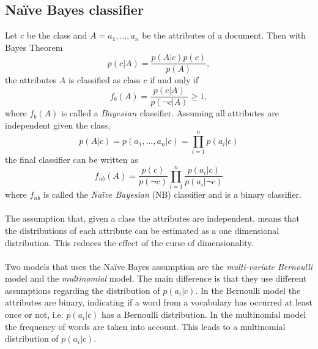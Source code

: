 \subsection{Naïve Bayes classifier}
Let $c$ be the class and $A = a_1, \dots ,a_n$ be the attributes of a document. Then with Bayes Theorem
\begin{equation}
p(c|A)=\frac{p(A|c)p(c)}{p(A)},
\end{equation}
the attributes $A$ is classified as class $c$ if and only if
\begin{equation}
f_b(A)=\frac{p(c|A)}{p(\neg c|A)} \geq 1,
\end{equation}
where $f_b(A)$ is called a $Bayesian$ classifier. Assuming all attributes are independent given the class, 
\[
p(A|c)=p(a_1,\dots ,a_n | c) = \prod_{i=1}^n p(a_i|c)
\]
the final classifier can be written as
\begin{equation}
f_{nb}(A) = \frac{p(c)}{p(\neg c)}\prod_{i=1}^n\frac{p(a_i|c)}{p(a_i|\neg c)}
\end{equation}
where $f_{nb}$ is called the \emph{Naïve Bayesian} (NB) classifier and is a binary classifier.\\\\
The assumption that, given a class the attributes are independent, means that the distributions of each attribute can be estimated as a one dimensional distribution. This reduces the effect of the curse of dimensionality.\cite{Zhang04optimality}\\\\
Two models that uses the Naïve Bayes assumption are the \emph{multi-variate Bernoulli} model and the \emph{multinomial} model. The main difference is that they use different assumptions regarding the distribution of $p(a_i|c)$. In the Bernoulli model the attributes are binary, indicating if a word from a vocabulary has occurred at least once or not, i.e. $p(a_i|c)$ has a Bernoulli distribution. In the multinomial model the frequency of words are taken into account. This leads to a multinomial distribution of $p(a_i|c)$. \cite{McCallum98acomparison}\cite{bernoulliDistr}\cite{multinomialDistr}
